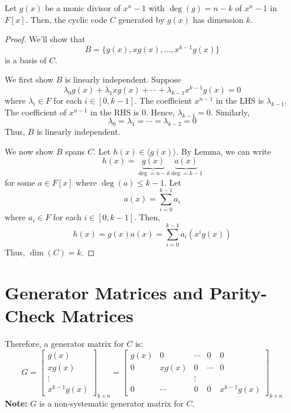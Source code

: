 \begin{thmbox}
    \begin{theorem}
        Let $ g(x) $ be a monic divisor of $ x^n-1 $ with $ \deg(g)=n-k $ of
        $ x^n-1 $ in $ F[x] $. Then, the cyclic code $ C $ generated
        by $ g(x) $ has dimension $ k $.
    \end{theorem}
\end{thmbox}

\begin{proof}
    We'll show that
    \[ B=\{g(x),xg(x),\ldots ,x^{k-1}g(x)\} \]
    is a basis of $ C $.

    We first show $ B $ is linearly independent. Suppose
    \[ \lambda_0g(x)+\lambda_1xg(x)+\cdots+\lambda_{k-1}x^{k-1}g(x)=0 \]
    where $ \lambda_i\in F $ for each $ i\in[0,k-1] $.
    The coefficient $ x^{n-1} $ in the LHS
    is $ \lambda_{k-1} $. The coefficient of $ x^{n-1} $ in the RHS is $ 0 $.
    Hence, $ \lambda_{k-1}=0 $. Similarly,
    \[ \lambda_0=\lambda_1=\cdots=\lambda_{k-2}=0 \]
    Thus, $ B $ is linearly independent.

    We now show $ B $ spans $ C $. Let $ h(x)\in \langle g(x)\rangle $.
    By Lemma, we can write
    \[ h(x)=\underbrace{g(x)}_{\deg = n-k}\underbrace{a(x)}_{\deg = k-1} \]
    for some $ a\in F[x] $ where $ \deg(a)\leqslant k-1 $. Let
    \[ a(x)=\sum\limits_{i=0}^{k-1} a_i \]
    where $ a_i\in F $ for each $ i\in[0,k-1] $. Then,
    \[ h(x)=g(x)a(x)=\sum\limits_{i=0}^{k-1} a_i(x^ig(x)) \]
    Thus, $ \dim(C)=k $.
\end{proof}

\section{Generator Matrices and Parity-Check Matrices}

Therefore, a generator matrix for $ C $ is:
\[ G
    =
    \begin{bmatrix}
        g(x)   \\
        xg(x)  \\
        \vdots \\
        x^{k-1}g(x)
    \end{bmatrix}_{k\times n}
    =
    \begin{bmatrix}
        g(x) & 0      & \cdots & 0      & 0           \\
        0    & xg(x)   & 0      & \cdots & 0           \\
             &        & \vdots                        \\
        0    & \cdots & 0      & 0      & x^{k-1}g(x)
    \end{bmatrix}_{k\times n}
\]
\textbf{Note:} $ G $ is a non-systematic generator matrix for $ C $.

